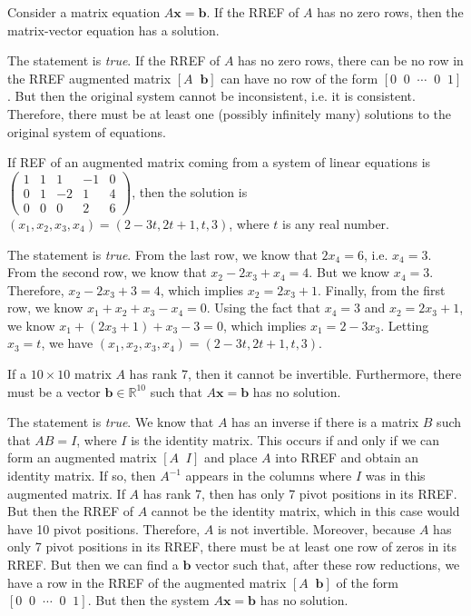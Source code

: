 \documentclass[11pt,letterpaper]{article}
\begin{document}
 Consider a matrix equation $A \mathbf{x}= \mathbf{b}$. If the RREF of $A$ has no zero rows, then the matrix-vector equation has a solution. \pspace

\sol The statement is \textit{true}. If the RREF of $A$ has no zero rows, there can be no row in the RREF augmented matrix $[A \;\;\mathbf{b}]$ can have no row of the form $[0 \;\;0\;\; \cdots\;\;0\;\;1]$. But then the original system cannot be inconsistent, i.e. it is consistent. Therefore, there must be at least one (possibly infinitely many) solutions to the original system of equations. \pvspace{1.3cm}



 If REF of an augmented matrix coming from a system of linear equations is $\begin{pmatrix} 1 & 1 & 1 & -1 & 0 \\ 0 & 1 & -2 & 1 & 4 \\ 0 & 0 & 0 & 2 & 6 \end{pmatrix}$, then the solution is $(x_1, x_2, x_3, x_4)= (2 - 3t, 2t + 1, t, 3)$, where $t$ is any real number. \pspace

\sol The statement is \textit{true}. From the last row, we know that $2x_4= 6$, i.e. $x_4= 3$. From the second row, we know that $x_2 - 2x_3 + x_4= 4$. But we know $x_4= 3$. Therefore, $x_2 - 2x_3 + 3= 4$, which implies $x_2= 2x_3 + 1$. Finally, from the first row, we know $x_1 + x_2 + x_3 - x_4= 0$. Using the fact that $x_4= 3$ and $x_2= 2x_3 + 1$, we know $x_1 + (2x_3 + 1) + x_3 - 3= 0$, which implies $x_1= 2 - 3x_3$. Letting $x_3= t$, we have $(x_1, x_2, x_3, x_4)= (2 - 3t, 2t + 1, t, 3)$. \pvspace{1.3cm}



 If a $10 \times 10$ matrix $A$ has rank 7, then it cannot be invertible. Furthermore, there must be a vector $\mathbf{b} \in \mathbb{R}^{10}$ such that $A\mathbf{x}= \mathbf{b}$ has no solution. \pspace

\sol The statement is \textit{true}. We know that $A$ has an inverse if there is a matrix $B$ such that $AB= I$, where $I$ is the identity matrix. This occurs if and only if we can form an augmented matrix $[A \;\;I]$ and place $A$ into RREF and obtain an identity matrix. If so, then $A^{-1}$ appears in the columns where $I$ was in this augmented matrix. If $A$ has rank 7, then has only 7 pivot positions in its RREF. But then the RREF of $A$ cannot be the identity matrix, which in this case would have 10 pivot positions. Therefore, $A$ is not invertible. Moreover, because $A$ has only 7 pivot positions in its RREF, there must be at least one row of zeros in its RREF. But then we can find a $\mathbf{b}$ vector such that, after these row reductions, we have a row in the RREF of the augmented matrix $[A\;\;\mathbf{b}]$ of the form $[0 \;\;0\;\; \cdots\;\;0\;\;1]$. But then the system $A\mathbf{x}= \mathbf{b}$ has no solution. \pvspace{1.3cm}
\end{document}
